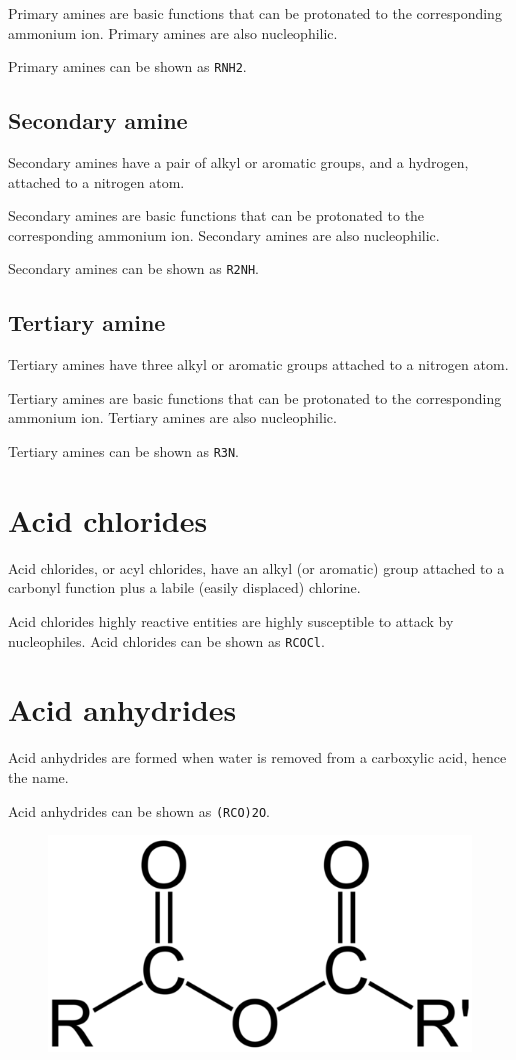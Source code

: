 \documentclass[oneside]{book}
\begin{document}
Primary amines are basic functions that can be protonated to the corresponding
ammonium ion.
Primary amines are also nucleophilic.

Primary amines can be shown as \texttt{RNH2}.

\subsection{Secondary amine}
Secondary amines have a pair of alkyl or aromatic groups, and a hydrogen,
attached to a nitrogen atom.

Secondary amines are basic functions that can be protonated to the corresponding
ammonium ion.
Secondary amines are also nucleophilic.

Secondary amines can be shown as \texttt{R2NH}.

\subsection{Tertiary amine}
Tertiary amines have three alkyl or aromatic groups attached to a nitrogen atom.

Tertiary amines are basic functions that can be protonated to the corresponding
ammonium ion.
Tertiary amines are also nucleophilic.

Tertiary amines can be shown as \texttt{R3N}.

\section{Acid chlorides}
Acid chlorides, or acyl chlorides, have an alkyl (or aromatic) group attached to
a carbonyl function plus a labile (easily displaced) chlorine.

Acid chlorides highly reactive entities are highly susceptible to attack by
nucleophiles.
Acid chlorides can be shown as \texttt{RCOCl}.

\section{Acid anhydrides}
Acid anhydrides are formed when water is removed from a carboxylic acid, hence
the name.

Acid anhydrides can be shown as \texttt{(RCO)2O}.

\begin{figure}[ht]
\includegraphics[scale=0.2]{carboxylic-acid-anhydride.png}
\centering
\end{figure}
\end{document}
